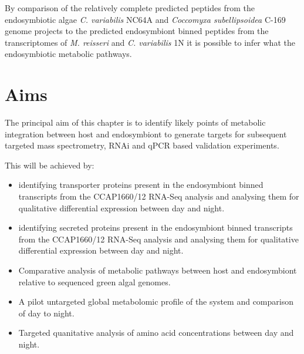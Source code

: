 By comparison of the relatively complete predicted peptides from 
the endosymbiotic algae \textit{C. variabilis} NC64A and \textit{Coccomyxa
subellipsoidea} C-169 genome projects to the predicted endosymbiont binned peptides
from the transcriptomes of \textit{M. reisseri} and \textit{C. variabilis} 1N
it is possible to infer what the endosymbiotic metabolic pathways.


%
%
%
%
%
%
%
%
%


\section{Aims}

The principal aim of this chapter is to identify
likely points of metabolic integration between host and 
endosymbiont to generate targets for subsequent 
targeted mass spectrometry, RNAi and qPCR based validation
experiments. 

This will be achieved by:
\begin{itemize}
\item identifying
    transporter proteins present in the endosymbiont
    binned transcripts from the CCAP1660/12 RNA-Seq analysis
    and analysing them for qualitative differential 
    expression between day and night. 
\item identifying
    secreted proteins present in the endosymbiont
    binned transcripts from the CCAP1660/12 RNA-Seq analysis
    and analysing them for qualitative differential 
    expression between day and night. 
\item Comparative analysis of metabolic pathways 
    between host and endosymbiont relative to 
    sequenced green algal genomes. 
\item A pilot untargeted global metabolomic profile of the 
    system and comparison of day to night.
\item Targeted quanitative analysis of amino acid concentrations
    between day and night. 
\end{itemize}

